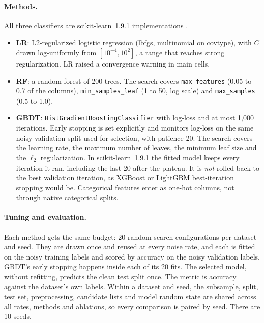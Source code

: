 \documentclass[11pt]{article}
\newcommand{\ds}[1]{\textsf{#1}}
\newcommand{\ct}{\ds{covtype}}
\begin{document}
\paragraph{Methods.} All three classifiers are scikit-learn~1.9.1 implementations
\citep{pedregosa2011}.
\begin{itemize}
  \item \textbf{LR}: L2-regularized logistic regression (lbfgs, multinomial on \ct), with
  $C$ drawn log-uniformly from $[10^{-4}, 10^{2}]$, a range that reaches strong
  regularization.
  LR raised a convergence warning in \NConvWarnCells{} main cells.
  \item \textbf{RF}: a random forest \citep{breiman2001} of 200 trees. The search covers
  \texttt{max\_features} (0.05 to 0.7 of the columns), \texttt{min\_samples\_leaf} (1 to 50,
  log scale) and \texttt{max\_samples} (0.5 to 1.0).
  \item \textbf{GBDT}: \texttt{HistGradientBoostingClassifier} with log-loss
  \citep{friedman2001} and at most 1,000 iterations. Early stopping is set explicitly and
  monitors log-loss on the same noisy validation split used for selection, with patience
  20. The search covers the learning rate, the maximum number of
  leaves, the minimum leaf size and the $\ell_2$ regularization. In scikit-learn~1.9.1 the fitted model keeps every iteration
  it ran, including the last 20 after the plateau. It is \emph{not} rolled back to the best
  validation iteration, as XGBoost or LightGBM best-iteration stopping would be.
  Categorical features enter as one-hot columns, not through native categorical splits.
\end{itemize}

\paragraph{Tuning and evaluation.} Each method gets the same budget: 20 random-search
configurations per dataset and seed. They are drawn once and reused at every noise rate,
and each is fitted on the noisy training labels and scored by accuracy on the noisy
validation labels. GBDT's early stopping happens inside each of its 20 fits. The selected
model, without refitting, predicts the clean test split once. The metric is accuracy against
the dataset's own labels. Within a dataset and seed, the subsample, split, test set,
preprocessing, candidate lists and model random state are shared across all rates, methods
and ablations, so every comparison is paired by seed. There are 10 seeds.
\end{document}
